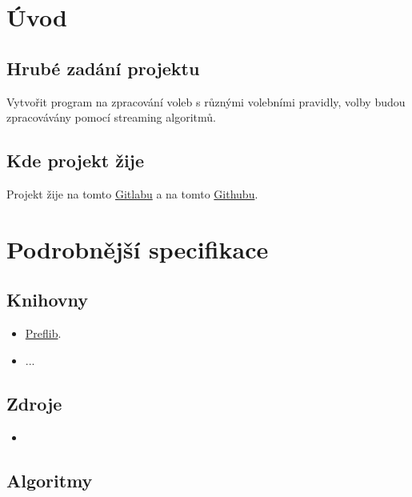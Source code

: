 \documentclass[a4paper,12pt]{report}
\begin{document}
	\pagestyle{toc}
	\tableofcontents
	\cleardoublepage
	\pagestyle{plain}
	\pagebreak
	
	\chapter{Úvod}
	
	\section{Hrubé zadání projektu}
	
	Vytvořit program na zpracování voleb s různými volebními pravidly, volby budou zpracovávány pomocí streaming algoritmů.
	
	\section{Kde projekt žije}
	
	Projekt žije na tomto \href{https://gitlab.com/adam_b3n3s/vote_streams}{Gitlabu} a na tomto \href{https://github.com/AdamBenes3/vote_streams}{Githubu}.
	
	\chapter{Podrobnější specifikace}
	
	\section{Knihovny}
	
	\begin{itemize}
		\item \href{https://github.com/PrefLib}{Preflib}.
		\item ...
	\end{itemize}
	
	\section{Zdroje}
	
	\begin{itemize}
		\item 
	\end{itemize}
	
	\section{Algoritmy}
	
\end{document}
